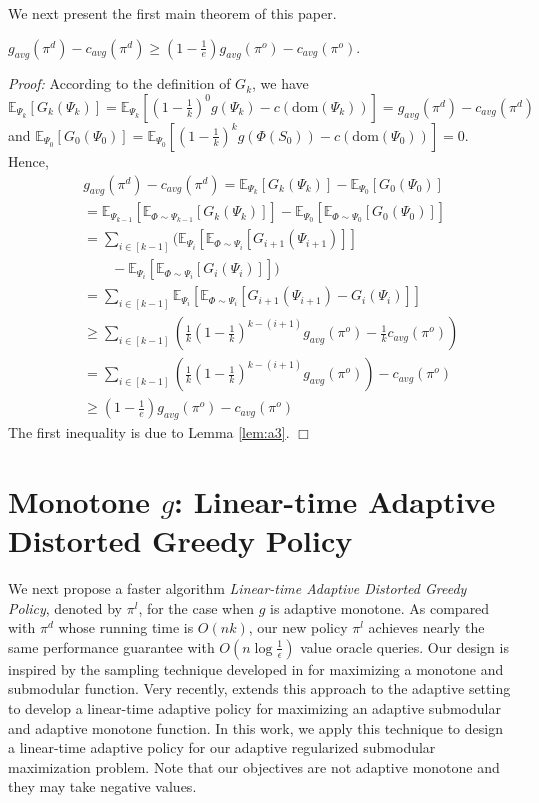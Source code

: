 \documentclass[twoside,leqno,twocolumn]{article}
\begin{document}
We next present the first main theorem of this paper.
\begin{theorem}
$g_{avg}(\pi^d) - c_{avg}(\pi^d) \geq (1-\frac{1}{e})g_{avg}(\pi^o) - c_{avg}(\pi^o)$.
\end{theorem}
\emph{Proof:} According to the definition of $G_k$, we have $\mathbb{E}_{\Psi_k}[G_{k}(\Psi_k)] = \mathbb{E}_{\Psi_k}[(1-\frac{1}{k})^{0} g(\Psi_k)-c(\textrm{dom}(\Psi_k))]=g_{avg}(\pi^d) - c_{avg}(\pi^d)$ and $\mathbb{E}_{\Psi_0}[G_{0}(\Psi_0)] = \mathbb{E}_{\Psi_0}[(1-\frac{1}{k})^{k} g(\Phi(S_0))-c(\textrm{dom}(\Psi_0))]=0$. Hence,
\begin{eqnarray*}
&& g_{avg}(\pi^d) - c_{avg}(\pi^d) = \mathbb{E}_{\Psi_k}[G_{k}(\Psi_k)] - \mathbb{E}_{\Psi_0}[G_{0}(\Psi_0)]\\
&& = \mathbb{E}_{\Psi_{k-1}}[\mathbb{E}_{\Phi \sim \Psi_{k-1}}[G_{k}(\Psi_k)]]- \mathbb{E}_{\Psi_0}[\mathbb{E}_{\Phi\sim \Psi_0}[G_{0}(\Psi_0)]] \\
&& = \sum_{i\in [k-1]}( \mathbb{E}_{\Psi_i}[\mathbb{E}_{\Phi\sim \Psi_i}[G_{i+1}(\Psi_{i+1})]]\\
&&\quad\quad- \mathbb{E}_{\Psi_i}[\mathbb{E}_{\Phi\sim \Psi_i}[G_{i}(\Psi_i)]]) \\
&& = \sum_{i\in [k-1]} \mathbb{E}_{\Psi_i}[\mathbb{E}_{\Phi\sim \Psi_i}[G_{i+1}(\Psi_{i+1})- G_{i}(\Psi_i)]] \\
&& \geq \sum_{i\in [k-1]} (\frac{1}{k}(1-\frac{1}{k})^{k-(i+1)}g_{avg}(\pi^o) -\frac{1}{k}c_{avg}(\pi^o))\\
&& = \sum_{i\in [k-1]}(\frac{1}{k}(1-\frac{1}{k})^{k-(i+1)}g_{avg}(\pi^o)) - c_{avg}(\pi^o)\\
&& \geq (1-\frac{1}{e})g_{avg}(\pi^o) - c_{avg}(\pi^o)
\end{eqnarray*} The first inequality is due to Lemma \ref{lem:a3}.
$\Box$
\section{Monotone $g$: Linear-time Adaptive Distorted Greedy Policy}
We next propose a faster algorithm \emph{Linear-time Adaptive Distorted Greedy Policy}, denoted by  $\pi^{l}$, for the case when $g$ is adaptive monotone. As compared with $\pi^{d}$ whose running time is $O(nk)$, our new policy $\pi^{l}$ achieves nearly the same performance guarantee with $O(n \log  \frac{1}{\epsilon})$ value oracle queries. Our design is inspired by the sampling technique developed in \cite{mirzasoleiman2015lazier} for maximizing a monotone and submodular function. Very recently, \cite{tang2021beyond} extends this approach to the adaptive setting to develop a linear-time adaptive policy for maximizing an adaptive submodular and adaptive monotone function. In this work, we apply this technique to design a linear-time adaptive policy for our adaptive regularized submodular maximization problem. Note that our objectives are not adaptive monotone and they may take negative values. %
\end{document}
